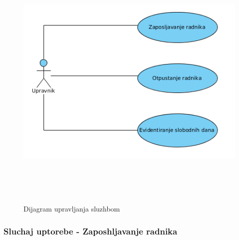 \documentclass[10 pt]{article}
\begin{document}
	\begin{figure}[H]
		\centering
		\includegraphics[width=12cm,height=12cm,keepaspectratio]{slike/UCUpravljanjeSluzbom.png}\\
		\caption{Dijagram upravljanja sluzhbom}
	\end{figure}
	
	\subsubsection{Sluchaj uptorebe - Zaposhljavanje radnika}
		
\end{document}
